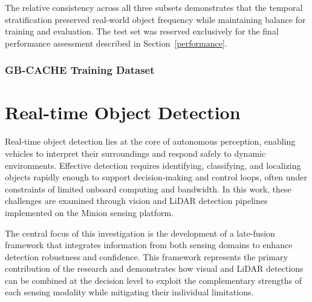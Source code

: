 \documentclass{erauthesis}
\begin{document}
\noindent The relative consistency across all three subsets demonstrates that the temporal stratification preserved real-world object frequency while maintaining balance for training and evaluation. 
The test set was reserved exclusively for the final performance assessment described in Section~\ref{performance}.

\subsection{GB-CACHE Training Dataset}
\label{sec:gbcache_training_data}





\chapter{Real-time Object Detection} \label{realtime_object_detection}

Real-time object detection lies at the core of autonomous perception, enabling vehicles to interpret their surroundings and respond safely to dynamic environments.
Effective detection requires identifying, classifying, and localizing objects rapidly enough to support decision-making and control loops, often under constraints of limited onboard computing and bandwidth.
In this work, these challenges are examined through vision and LiDAR detection pipelines implemented on the Minion sensing platform.

The central focus of this investigation is the development of a late-fusion framework that integrates information from both sensing domains to enhance detection robustness and confidence.
This framework represents the primary contribution of the research and demonstrates how visual and LiDAR detections can be combined at the decision level to exploit the complementary strengths of each sensing modality while mitigating their individual limitations.
\end{document}
